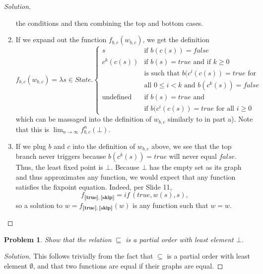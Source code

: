 \documentclass{article}
\newtheorem{problem}{Problem}[section]}
\begin{document}
\begin{proof}[Solution]
\begin{enumerate}[label=\alph*)]
            the conditions and then combining the top and bottom cases.
        \item If we expand out the function $f_{b,c}(w_{b,c})$, we get the
            definition
            \[
                f_{b,c}(w_{b,c})=\lambda s\in State.\begin{cases}
                    s & \text{if $b(c(s))=false$} \\[2ex]
                    c^k(c(s)) & \text{if $b(s)=true$ and if $k\geq0$} \\
                    & \text{is such that $b(c^i(c(s))=true$ for} \\
                    & \text{all $0\leq i<k$ and $b(c^k(s))=false$} \\[2ex]
                    \text{undefined} & \text{if $b(s)=true$ and} \\
                    & \text{if $b(c^i(c(s))=true$ for all $i\geq 0$}
                \end{cases}
            \]
            which can be massaged into the definition of $w_{b,c}$ similarly to
            in part a). Note that this is $\lim_{n\to\infty}f^n_{b,c}(\bot)$.
        \item If we plug $b$ and $c$ into the definition of $w_{b,c}$ above, we
            see that the top branch never triggers because $b(c^k(s))=true$ will
            never equal $false$. Thus, the least fixed point is $\bot$. Because
            $\bot$ has the empty set as its graph and thus approximates any
            function, we would expect that any function satisfies the fixpoint
            equation. Indeed, per Slide 11,
            \[
            f_{\llbracket \textbf{true}\rrbracket,\llbracket
            \textbf{skip}\rrbracket}=\textit{if}\,(true,w(s),s),
            \]
            so a solution to $w=f_{\llbracket \textbf{true}\rrbracket,\llbracket
            \textbf{skip}\rrbracket}(w)$ is any function such that $w=w$.
    \end{enumerate}
\end{proof}

\begin{problem}
    Show that the relation $\sqsubseteq$ is a partial order with least
    element $\bot$.
\end{problem}
\begin{proof}[Solution]
    This follows trivially from the fact that $\subseteq$ is a partial order
    with least element $\emptyset$, and that two functions are equal if their
    graphs are equal.
\end{proof}
\end{document}
